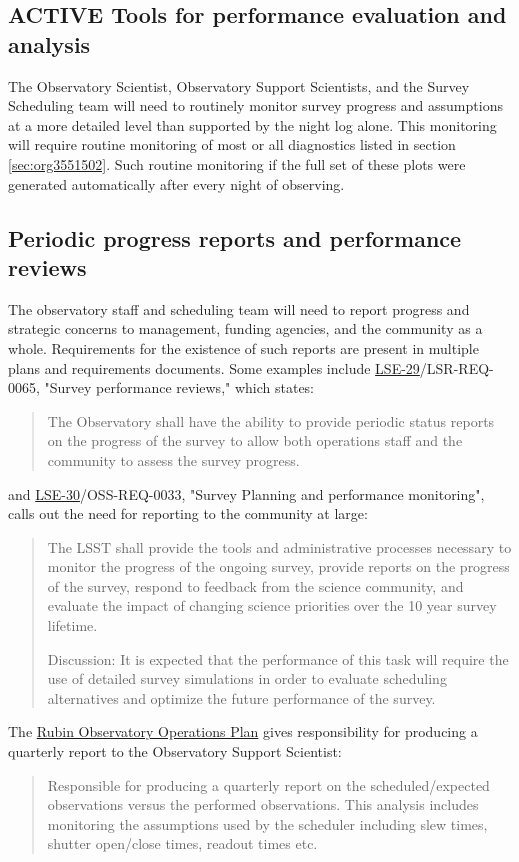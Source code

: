 \subsection{{\bfseries\sffamily ACTIVE} Tools for performance evaluation and analysis}
\label{sec:org81d4b25}
The Observatory Scientist, Observatory Support Scientists, and the Survey Scheduling team will need to routinely monitor survey progress and assumptions at a more detailed level than supported by the night log alone.
This monitoring will require routine monitoring of most or all diagnostics listed in section \ref{sec:org3551502}. 
Such routine monitoring if the full set of these plots were generated automatically after every night of observing. 

\subsection{Periodic progress reports and performance reviews}
\label{sec:org3f62697}
The observatory staff and scheduling team will need to report progress and strategic concerns to management, funding agencies, and the community as a whole. Requirements for the existence of such reports are present in multiple plans and requirements documents. Some examples include \href{https://ls.st/lse-29}{LSE-29}/LSR-REQ-0065, "Survey performance reviews," which states:
\begin{quote}
The Observatory shall have the ability to provide periodic status reports on the progress of the survey to allow both operations staff and the community to assess the survey progress.
\end{quote}
and \href{https://ls.st/lse-30}{LSE-30}/OSS-REQ-0033, "Survey Planning and performance monitoring", calls out the need for reporting to the community at large:
\begin{quote}
The LSST shall provide the tools and administrative processes necessary to monitor the progress of the ongoing survey, provide reports on the progress of the survey, respond to feedback from the science community, and evaluate the impact of changing science priorities over the 10 year survey lifetime.

Discussion: It is expected that the performance of this task will require the use of detailed survey simulations in order to evaluate scheduling alternatives and optimize the future performance of the survey.
\end{quote}

The \href{https://docushare.lsst.org/docushare/dsweb/Get/Document-36797/Rubin\%20Observatory\%20Operations\%20Plan\%20April\%202020.pdf}{Rubin Observatory Operations Plan} gives responsibility for producing a quarterly report to the Observatory Support Scientist:
\begin{quote}
Responsible for producing a quarterly report on the scheduled/expected observations versus the performed observations. This analysis includes monitoring the assumptions used by the scheduler including slew times, shutter open/close times, readout times etc. 
\end{quote}

